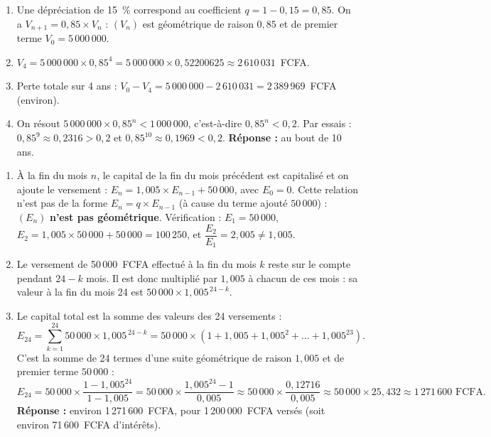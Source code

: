 \documentclass[11pt]{article}
\begin{document}
\begin{corrige}[Exercice 2]
\begin{enumerate}
  \item Une dépréciation de 15~\% correspond au coefficient $q = 1 - 0,15 = 0,85$. On a $V_{n+1} = 0,85 \times V_n$ : $(V_n)$ est géométrique de raison $0,85$ et de premier terme $V_0 = 5\,000\,000$.
  \item $V_4 = 5\,000\,000 \times 0,85^4 = 5\,000\,000 \times 0,52200625 \approx 2\,610\,031$~FCFA.
  \item Perte totale sur 4 ans : $V_0 - V_4 = 5\,000\,000 - 2\,610\,031 = 2\,389\,969$~FCFA (environ).
  \item On résout $5\,000\,000 \times 0,85^n < 1\,000\,000$, c'est-à-dire $0,85^n < 0,2$. Par essais : $0,85^9 \approx 0,2316 > 0,2$ et $0,85^{10} \approx 0,1969 < 0,2$. \textbf{Réponse :} au bout de 10 ans.
\end{enumerate}
\end{corrige}

\begin{corrige}[Exercice 3]
\begin{enumerate}
  \item À la fin du mois $n$, le capital de la fin du mois précédent est capitalisé et on ajoute le versement : $E_n = 1,005 \times E_{n-1} + 50\,000$, avec $E_0 = 0$.
  Cette relation n'est pas de la forme $E_n = q \times E_{n-1}$ (à cause du terme ajouté $50\,000$) : $(E_n)$ \textbf{n'est pas géométrique}. Vérification : $E_1 = 50\,000$, $E_2 = 1,005 \times 50\,000 + 50\,000 = 100\,250$, et $\dfrac{E_2}{E_1} = 2,005 \neq 1,005$.
  \item Le versement de 50\,000~FCFA effectué à la fin du mois $k$ reste sur le compte pendant $24 - k$ mois. Il est donc multiplié par $1,005$ à chacun de ces mois : sa valeur à la fin du mois 24 est $50\,000 \times 1,005^{\,24-k}$.
  \item Le capital total est la somme des valeurs des 24 versements :
  \[
  E_{24} = \sum_{k=1}^{24} 50\,000 \times 1,005^{\,24-k} = 50\,000 \times \left(1 + 1,005 + 1,005^2 + \dots + 1,005^{23}\right) .
  \]
  C'est la somme de 24 termes d'une suite géométrique de raison $1,005$ et de premier terme $50\,000$ :
  \[
  E_{24} = 50\,000 \times \frac{1 - 1,005^{24}}{1 - 1,005} = 50\,000 \times \frac{1,005^{24} - 1}{0,005} \approx 50\,000 \times \frac{0,12716}{0,005} \approx 50\,000 \times 25,432 \approx 1\,271\,600 \text{ FCFA}.
  \]
  \textbf{Réponse :} environ 1\,271\,600~FCFA, pour 1\,200\,000~FCFA versés (soit environ 71\,600~FCFA d'intérêts).
\end{enumerate}
\end{corrige}
\end{document}
